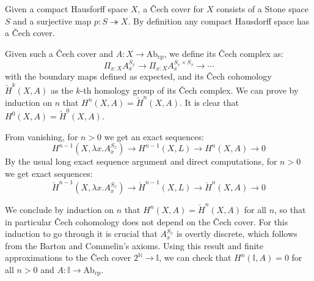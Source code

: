 \documentclass[letterpaper]{../util/easychair}
\newcommand{\N}{\mathbb{N}}
\begin{document}
Given a compact Hausforff space $X$, a \v{C}ech cover for $X$ consists of a Stone space $S$ and a surjective map $p:S\twoheadrightarrow X$. By definition any compact Hausdorff space has a \v{C}ech cover.

Given such a \v{C}ech cover and $A:X\to \mathrm{Ab}_{\mathrm{cp}}$, we define its \v{C}ech complex as:
\[\Pi_{x:X}A_x^{S_x} \to \Pi_{x:X}A_x^{S_x\times S_x} \to \cdots\]
with the boundary maps defined as expected, and its \v{C}ech cohomology $\check{H}^k(X,A)$ as the $k$-th homology group of its \v{C}ech complex. We can prove by induction on $n$ that $H^n(X,A) = \check{H}^n(X,A)$. It is clear that $H^0(X,A) = \check{H}^0(X,A)$.

From vanishing, for $n>0$ we get an exact sequences:
\[H^{n-1}(X,\lambda x.A_x^{S_x}) \to H^{n-1}(X,L)\to H^n(X,A)\to 0\]
By the usual long exact sequence argument and direct computations, for $n>0$ we get exact sequences:
\[\check{H}^{n-1}(X,\lambda x.A_x^{S_x}) \to \check{H}^{n-1}(X,L)\to \check{H}^n(X,A)\to 0\]

We conclude by induction on $n$ that $H^n(X,A) = \check{H}^n(X,A)$ for all $n$, so that in particular \v{C}ech cohomology does not depend on the \v{C}ech cover. For this induction to go through it is crucial that $A_x^{S_x}$ is overtly discrete, which follows from the Barton and Commelin's axioms.  Using this result and finite approximations to the \v{C}ech cover $2^\N\to \mathbb{I}$, we can check that $H^n(\mathbb{I},A) = 0$ for all $n>0$ and $A:\mathbb{I}\to \mathrm{Ab}_{\mathrm{cp}}$.


\printbibliography
\end{document}
